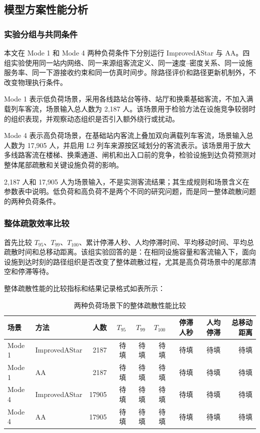 \documentclass[UTF8,a4paper,12pt]{ctexart}
\begin{document}
\subsection{模型方案性能分析}

\subsubsection{实验分组与共同条件}

本文在 Mode 1 和 Mode 4 两种负荷条件下分别运行 ImprovedAStar 与 AA。四组实验使用同一站内网络、同一来源组客流定义、同一速度--密度关系、同一设施服务率、同一下游接收约束和同一仿真时间步。除路径评价和路径更新机制外，不改变物理执行条件。

Mode 1 表示低负荷场景，采用各线路站台等待、站厅和换乘基础客流，不加入满载列车客流，场景输入总人数为 2,187 人。该场景用于检验方法在设施竞争较弱时的组织表现，并观察动态组织是否引入额外绕行或扰动。

Mode 4 表示高负荷场景，在基础站内客流上叠加双向满载列车客流，场景输入总人数为 17,905 人，并启用 L2 列车来源按区域划分的客流表示。该场景用于放大多线路客流在楼梯、换乘通道、闸机和出入口前的竞争，检验设施到达负荷预测对整体尾部疏散和关键设施负荷的影响。

2,187 人和 17,905 人为场景输入，不是实测客流结果；其生成规则和场景含义在参数表中说明。低负荷和高负荷不是两个不同的研究问题，而是同一整体疏散问题的两种负荷条件。

\subsubsection{整体疏散效率比较}

首先比较 \(T_{95}\)、\(T_{99}\)、\(T_{100}\)、累计停滞人秒、人均停滞时间、平均移动时间、平均总疏散时间和总移动距离。该组实验回答的是：在相同设施容量和客流输入下，面向设施到达时刻的路径组织是否改变了整体疏散过程，尤其是高负荷场景中的尾部清空和停滞等待。

整体疏散性能的比较指标和结果记录格式如表所示：

\begin{table}[htbp]
\centering
\caption{两种负荷场景下的整体疏散性能比较}
\small
\begin{tabular}{llrrrrrrr}
\toprule
场景 & 方法 & 人数 & \(T_{95}\) & \(T_{99}\) & \(T_{100}\) & 停滞人秒 & 人均停滞 & 总移动距离 \\
\midrule
Mode 1 & ImprovedAStar & 2187 & 待填 & 待填 & 待填 & 待填 & 待填 & 待填 \\
Mode 1 & AA & 2187 & 待填 & 待填 & 待填 & 待填 & 待填 & 待填 \\
Mode 4 & ImprovedAStar & 17905 & 待填 & 待填 & 待填 & 待填 & 待填 & 待填 \\
Mode 4 & AA & 17905 & 待填 & 待填 & 待填 & 待填 & 待填 & 待填 \\
\bottomrule
\end{tabular}
\end{table}
\end{document}
